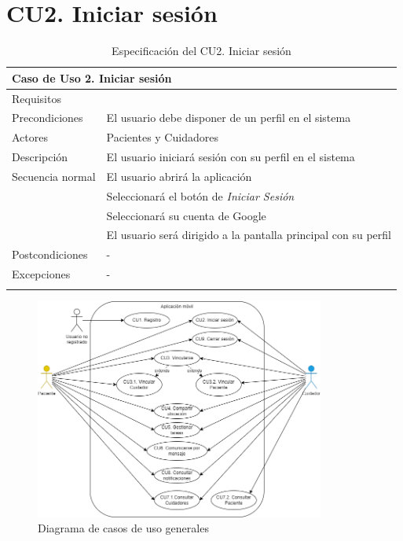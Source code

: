\section{CU2. Iniciar sesión}
\label{sec:cu:iniciar_sesion}

\begin{longtable}{|p{} p{}|}
    \hline
    \multicolumn{2}{|l|}{\textbf{Caso de Uso 2. Iniciar sesión}} \\ \hline \hline
    Requisitos          & {req:inicio_sesion} \\ \hline
    Precondiciones      & El usuario debe disponer de un perfil en el sistema \\ \hline
    Actores             & Pacientes y Cuidadores \\ \hline
    Descripción         & El usuario iniciará sesión con su perfil en el sistema \\ \hline
    Secuencia normal    & El usuario abrirá la aplicación \\
                        & Seleccionará el botón de \emph{Iniciar Sesión} \\
                        & Seleccionará su cuenta de Google \\
                        & El usuario será dirigido a la pantalla principal con su perfil \\ \hline
    Postcondiciones     & - \\ \hline
    Excepciones         & - \\ \hline
    \caption{Especificación del CU2. Iniciar sesión}
    \label{cu:iniciar_sesion}
\end{longtable}

\begin{figure}[H]
    \centering
    \includegraphics[width=0.85\textwidth]{images/Analisis/CasosUsoGeneral.drawio.png}
    \caption{Diagrama de casos de uso generales}
    \label{fig:casos_uso_general}
\end{figure}

